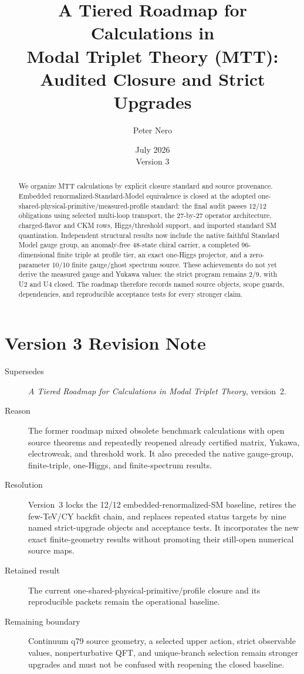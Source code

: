 \documentclass[11pt]{article}
\title{A Tiered Roadmap for Calculations in\\Modal Triplet Theory (MTT): Audited Closure and Strict Upgrades}
\author{Peter Nero}
\date{July 2026\\Version 3}
\begin{document}
\maketitle

\begin{abstract}
We organize MTT calculations by explicit closure standard and source
provenance. Embedded renormalized-Standard-Model equivalence is closed at the
adopted one-shared-physical-primitive/measured-profile standard: the final
audit passes 12/12 obligations using selected multi-loop transport, the
27-by-27 operator architecture, charged-flavor and CKM rows,
Higgs/threshold support, and imported standard SM quantization. Independent
structural results now include the native faithful Standard Model gauge group,
an anomaly-free 48-state chiral carrier, a completed 96-dimensional finite
triple at profile tier, an exact one-Higgs projector, and a zero-parameter
10/10 finite gauge/ghost spectrum source. These achievements do not yet
derive the measured gauge and Yukawa values: the strict program remains 2/9,
with U2 and U4 closed. The roadmap therefore records named source objects,
scope guards, dependencies, and reproducible acceptance tests for every
stronger claim.
\end{abstract}

\section*{Version 3 Revision Note}
\begin{description}
\item[Supersedes] \emph{A Tiered Roadmap for Calculations in Modal Triplet
Theory}, version~2.
\item[Reason] The former roadmap mixed obsolete benchmark calculations with
open source theorems and repeatedly reopened already certified matrix,
Yukawa, electroweak, and threshold work. It also preceded the native
gauge-group, finite-triple, one-Higgs, and finite-spectrum results.
\item[Resolution] Version~3 locks the 12/12 embedded-renormalized-SM baseline,
retires the few-TeV/CY backfit chain, and replaces repeated status targets by
nine named strict-upgrade objects and acceptance tests. It incorporates the
new exact finite-geometry results without promoting their still-open numerical
source maps.
\item[Retained result] The current one-shared-physical-primitive/profile
closure and its reproducible packets remain the operational baseline.
\item[Remaining boundary] Continuum q79 source geometry, a selected upper
action, strict observable values, nonperturbative QFT, and unique-branch
selection remain stronger upgrades and must not be confused with reopening
the closed baseline.
\end{description}
\end{document}
